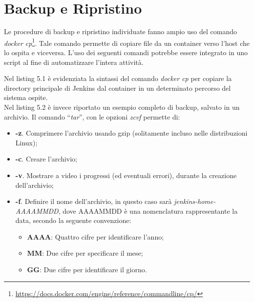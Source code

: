 \section{Backup e Ripristino}

Le procedure di backup e ripristino individuate fanno ampio uso del comando \textit{docker cp}\footnote{\url{https://docs.docker.com/engine/reference/commandline/cp/}}. Tale comando permette di copiare file da un \gls{container} verso l'\gls{host} che lo ospita e viceversa. L'uso dei seguenti comandi potrebbe essere integrato in uno script al fine di automatizzare l'intera attività.

  

Nel listing 5.1 è evidenziata la sintassi del comando \textit{docker cp} per copiare la directory principale di Jenkins dal \gls{container} in un determinato percorso del sistema ospite. \\ 

Nel listing 5.2 è invece riportato un esempio completo di backup, salvato in un archivio. Il comando ``\textit{tar}'', con le opzioni \textit{zcvf} permette di:
\begin{itemize}
    \item \textbf{-z}. Comprimere l'archivio usando gzip (solitamente incluso nelle distribuzioni \gls{Linux});
    \item \textbf{-c}. Creare l'archivio;
    \item \textbf{-v}. Mostrare a video i progressi (ed eventuali errori), durante la creazione dell'archivio;
    \item \textbf{-f}. Definire il nome dell'archivio, in questo caso sarà \textit{jenkins-home-AAAAMMDD}, dove
    AAAAMMDD è una nomenclatura rappresentante la data, secondo la seguente convenzione:
    \begin{itemize}
        \item \textbf{AAAA}: Quattro cifre per identificare l'anno;
        \item \textbf{MM}: Due cifre per specificare il mese;
        \item \textbf{GG}: Due cifre per identificare il giorno.
    \end{itemize}
\end{itemize}

